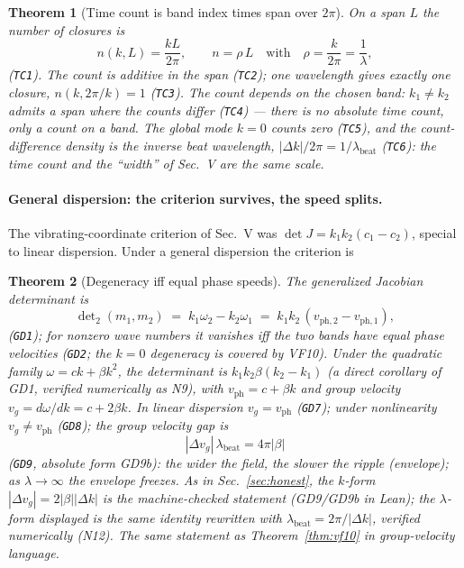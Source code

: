 \documentclass[aps,prd,preprint,superscriptaddress,amsmath,amssymb]{revtex4-2}
\newtheorem{theorem}{Theorem}[section]
\begin{document}
\begin{theorem}[Time count is band index times span over $2\pi$]
\label{thm:tc}
On a span $L$ the number of closures is
\begin{equation}
n(k,L)=\frac{kL}{2\pi},
\qquad
n=\rho\,L\quad\text{with}\quad \rho=\frac{k}{2\pi}=\frac1\lambda,
\label{eq:ntc}
\end{equation}
(\texttt{TC1}).  The count is additive in the span (\texttt{TC2}); one
wavelength gives exactly one closure, $n(k,2\pi/k)=1$ (\texttt{TC3}).
The count depends on the chosen band: $k_1\ne k_2$ admits a span where
the counts differ (\texttt{TC4}) --- \emph{there is no absolute time
count, only a count on a band.}  The global mode $k=0$ counts zero
(\texttt{TC5}), and the count-difference density is the inverse beat
wavelength,
$|\Delta k|/2\pi=1/\lambda_{\mathrm{beat}}$ (\texttt{TC6}): the time
count and the ``width'' of Sec.~V are the same scale.
\end{theorem}

\paragraph{General dispersion: the criterion survives, the speed
splits.}
The vibrating-coordinate criterion of Sec.~V was
$\det J=k_1k_2(c_1-c_2)$, special to linear dispersion.  Under a
general dispersion the criterion is

\begin{theorem}[Degeneracy iff equal phase speeds]
\label{thm:gd}
The generalized Jacobian determinant is
\begin{equation}
\det\nolimits_2(m_1,m_2)
\;=\; k_1\omega_2-k_2\omega_1
\;=\; k_1k_2\,(v_{{\mathrm{ph}},2}-v_{{\mathrm{ph}},1}),
\label{eq:det2}
\end{equation}
(\texttt{GD1}); for nonzero wave numbers it vanishes iff the two
bands have equal phase velocities (\texttt{GD2}; the $k=0$ degeneracy
is covered by VF10).  Under the quadratic family
$\omega=ck+\beta k^2$, the determinant is $k_1k_2\beta(k_2-k_1)$
(a direct corollary of GD1, verified numerically as N9), with
$v_{\mathrm{ph}}=c+\beta k$ and group velocity
$v_g=d\omega/dk=c+2\beta k$.  In linear dispersion
$v_g=v_{\mathrm{ph}}$ (\texttt{GD7}); under nonlinearity
$v_g\ne v_{\mathrm{ph}}$ (\texttt{GD8}); the group velocity gap is
\begin{equation}
|\Delta v_g|\,\lambda_{\mathrm{beat}}=4\pi|\beta|
\label{eq:gvgap}
\end{equation}
(\texttt{GD9}, absolute form GD9b): \emph{the wider the field, the slower the ripple
(envelope); as $\lambda\to\infty$ the envelope freezes.}  As in
Sec.~\ref{sec:honest}, the $k$-form $|\Delta v_g|=2|\beta||\Delta k|$ is the
machine-checked statement (GD9/GD9b in Lean); the $\lambda$-form
displayed is the same identity rewritten with
$\lambda_{\mathrm{beat}}=2\pi/|\Delta k|$, verified numerically
(N12).  The same
statement as Theorem~\ref{thm:vf10} in group-velocity language.
\end{theorem}
\end{document}
